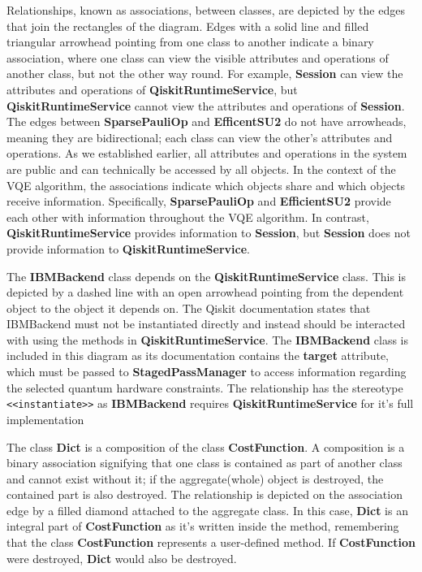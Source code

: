 \documentclass{article}
\begin{document}
{Relationships, known as associations, between classes, are depicted by the edges that join the rectangles of the diagram. Edges with a solid line and filled triangular arrowhead pointing from one class to another indicate a binary association, where one class can view the visible attributes and operations of another class, but not the other way round\cite{Seidl_Scholz_Huemer_Kappel_Duffy_2014}. For example, \textbf{Session} can view the attributes and operations of \textbf{QiskitRuntimeService}, but \textbf{QiskitRuntimeService} cannot view the attributes and operations of \textbf{Session}. The edges between \textbf{SparsePauliOp} and \textbf{EfficentSU2} do not have arrowheads, meaning they are bidirectional\cite{Seidl_Scholz_Huemer_Kappel_Duffy_2014}; each class can view the other's attributes and operations. As we established earlier, all attributes and operations in the system are public and can technically be accessed by all objects. In the context of the VQE algorithm, the associations indicate which objects share and which objects receive information. Specifically, \textbf{SparsePauliOp} and \textbf{EfficientSU2} provide each other with information throughout the VQE algorithm. In contrast, \textbf{QiskitRuntimeService} provides information to \textbf{Session}, but \textbf{Session} does not provide information to \textbf{QiskitRuntimeService}.

The \textbf{IBMBackend} class depends on the \textbf{QiskitRuntimeService} class. This is depicted by a dashed line with an open arrowhead pointing from the dependent object to the object it depends on. The Qiskit documentation states that IBMBackend must not be instantiated directly and instead should be interacted with using the methods in \textbf{QiskitRuntimeService}\cite{IBMBackend}. The \textbf{IBMBackend} class is included in this diagram as its documentation contains the \textbf{target} attribute, which must be passed to \textbf{StagedPassManager} to access information regarding the selected quantum hardware constraints. The relationship has the stereotype \texttt{<<instantiate>>} as \textbf{IBMBackend} requires \textbf{QiskitRuntimeService} for it's full implementation\cite{Dependencyrelationships}

The class \textbf{Dict} is a composition of the class \textbf{CostFunction}. A composition is a binary association signifying that one class is contained as part of another class and cannot exist without it; if the aggregate(whole) object is destroyed, the contained part is also destroyed\cite{UMLComposition}. The relationship is depicted on the association edge by a filled diamond attached to the aggregate class. In this case, \textbf{Dict} is an integral part of \textbf{CostFunction} as it's written inside the method, remembering that the class \textbf{CostFunction} represents a user-defined method. If \textbf{CostFunction} were destroyed, \textbf{Dict} would also be destroyed.

}
\end{document}

